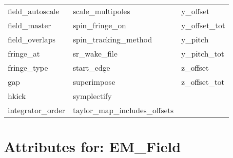 \begin{tabular}{lll}
field_autoscale                & scale_multipoles            & y_offset                    \\
field_master                & spin_fringe_on              & y_offset_tot                \\
field_overlaps              & spin_tracking_method        & y_pitch                     \\
fringe_at                   & sr_wake_file                & y_pitch_tot                 \\
fringe_type                 & start_edge                  & z_offset                    \\
gap                         & superimpose                 & z_offset_tot                \\
hkick                       & symplectify                 &                             \\
integrator_order            & taylor_map_includes_offsets &                             \\
 \bottomrule
 \end{tabular}
 \vfill
 
 \section{Attributes for: EM_Field}
 \label{s:list.em.field}
 
